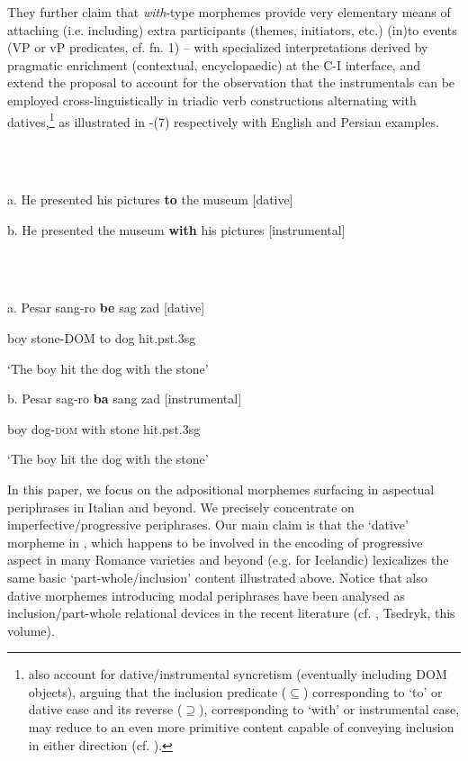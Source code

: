 \documentclass[output=paper]{langsci/langscibook}
\begin{document}
They further claim that \textit{with}{}-type morphemes provide very elementary means of attaching (i.e. including) extra participants (themes, initiators, etc.) (in)to events (VP or vP predicates, cf. fn. 1) – with specialized interpretations derived by pragmatic enrichment (contextual, encyclopaedic) at the C-I interface, and extend the proposal to account for the observation that the instrumentals can be employed cross-linguistically in triadic verb constructions alternating with datives,\footnote{\citet{FrancoManzini2017b} also account for dative/instrumental syncretism (eventually including DOM objects), arguing that the inclusion predicate (\textrm{${\subseteq}$}) corresponding to ‘to’ or dative case and its reverse (\textrm{${\supseteq}$}), corresponding to ‘with’ or instrumental case, may reduce to an even more primitive content capable of conveying inclusion in either direction (cf. ).}  as illustrated in -(7) respectively with English and Persian examples. 

\ea%
    \label{ex:key:6}
    \gll\\
        \\
    \glt
    \z

            a. He presented his pictures \textbf{to} the museum    [dative]

b. He presented the museum \textbf{with} his pictures  [instrumental]

\ea%
    \label{ex:key:7}
    \gll\\
        \\
    \glt
    \z

           a.   Pesar   sang-ro   \textbf{be}   sag   zad     [dative]

boy   stone-DOM   to   dog   hit.pst.3sg 

‘The boy hit the dog with the stone’ 

  b.   Pesar   sag-ro     \textbf{ba}   sang   zad [instrumental]

  boy   dog-\textsc{dom}  with   stone   hit.pst.3sg 

  ‘The boy hit the dog with the stone’

In this paper, we focus on the adpositional morphemes surfacing in aspectual periphrases in Italian and beyond. We precisely concentrate on imperfective/progressive periphrases. Our main claim is that the ‘dative’ morpheme in , which happens to be involved in the encoding of progressive aspect in many Romance varieties \citep{ManziniEtAl2017} and beyond (e.g. \citealt{Jóhannsdóttir2012} for Icelandic) lexicalizes the same basic ‘part-whole/inclusion’ content illustrated above. Notice that also dative morphemes introducing modal periphrases have been analysed as inclusion/part-whole relational devices in the recent literature (cf. \citealt{BjorkmanCowper2016}, Tsedryk, this volume). 
\end{document}
